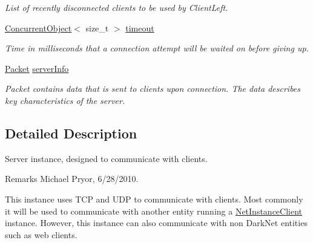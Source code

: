 \begin{DoxyCompactItemize}
\begin{DoxyCompactList}\small\item\em List of recently disconnected clients to be used by ClientLeft. \item\end{DoxyCompactList}\item 
\hypertarget{class_net_instance_server_ad8e079318790eb164ba2f52d80fcbd86}{
\hyperlink{class_concurrent_object}{ConcurrentObject}$<$ size\_\-t $>$ \hyperlink{class_net_instance_server_ad8e079318790eb164ba2f52d80fcbd86}{timeout}}
\label{class_net_instance_server_ad8e079318790eb164ba2f52d80fcbd86}

\begin{DoxyCompactList}\small\item\em Time in milliseconds that a connection attempt will be waited on before giving up. \item\end{DoxyCompactList}\item 
\hypertarget{class_net_instance_server_a4b65e49e2bc9b65f269e43e46ad87635}{
\hyperlink{class_packet}{Packet} \hyperlink{class_net_instance_server_a4b65e49e2bc9b65f269e43e46ad87635}{serverInfo}}
\label{class_net_instance_server_a4b65e49e2bc9b65f269e43e46ad87635}

\begin{DoxyCompactList}\small\item\em Packet contains data that is sent to clients upon connection. The data describes key characteristics of the server. \item\end{DoxyCompactList}\end{DoxyCompactItemize}


\subsection{Detailed Description}
Server instance, designed to communicate with clients. \begin{DoxyRemark}{Remarks}
Michael Pryor, 6/28/2010.
\end{DoxyRemark}
This instance uses TCP and UDP to communicate with clients. Most commonly it will be used to communicate with another entity running a \hyperlink{class_net_instance_client}{NetInstanceClient} instance. However, this instance can also communicate with non DarkNet entities such as web clients. 

